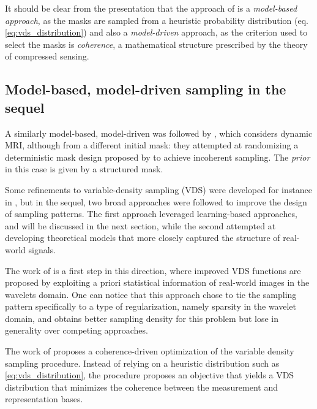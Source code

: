 It should be clear from the presentation that the approach of \citet{lustig2007sparse} is a \textit{model-based approach}, as the masks are sampled from a heuristic probability distribution (eq. \ref{eq:vds_distribution}) and also a \textit{model-driven} approach, as the criterion used to select the masks is \textit{coherence}, a mathematical structure prescribed by the theory of compressed sensing. 

\subsection{Model-based, model-driven sampling in the sequel}
A similarly model-based, model-driven was followed by \citet{gamper2008compressed}, which considers dynamic MRI, although from a different initial mask: they attempted at randomizing a deterministic mask design proposed by \citet{tsao2003k} to achieve incoherent sampling. The \textit{prior} in this case is given by a structured mask. 

Some refinements to variable-density sampling (VDS) were developed for instance in \citep{wang2009pseudo}, but in the sequel, two broad approaches were followed to improve the design of sampling patterns. The first approach leveraged learning-based approaches, and will be discussed in the next section, while the second attempted at developing theoretical models that more closely captured the structure of real-world signals. 


The work of \citet{wang2009variable} is a first step in this direction, where improved VDS functions are proposed by exploiting a priori statistical information of real-world images in the wavelets domain. One can notice that this approach chose to tie the sampling pattern specifically to a type of regularization, namely sparsity in the wavelet domain, and obtains better sampling density for this problem but lose in generality over competing approaches. 

The work of \citet{puy2011variable} proposes a coherence-driven optimization of the variable density sampling procedure. Instead of relying on a heuristic distribution such as \eqref{eq:vds_distribution}, the procedure proposes an objective that yields a VDS distribution that minimizes the coherence between the measurement and representation bases. 

